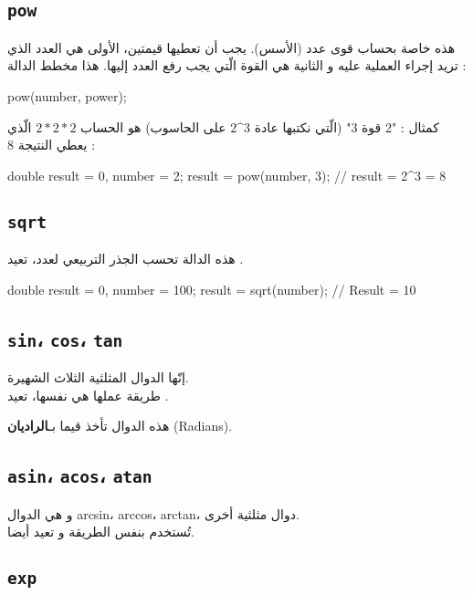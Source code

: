 \subsection{\texttt{pow}}

هذه خاصة بحساب قوى عدد (الأسس). يجب أن تعطيها قيمتين، الأولى هي العدد الذي تريد إجراء العملية عليه و الثانية هي القوة الّتي يجب رفع العدد إليها. هذا مخطط الدالة :

\begin{Csource}
pow(number, power);
\end{Csource}

كمثال : "2 قوة 3" (الّتي نكتبها عادة
$ 2\^{}3 $
على الحاسوب) هو الحساب
$ 2 * 2 * 2 $
الّذي يعطي النتيجة 8 :

\begin{Csource}
double result = 0, number = 2;
result = pow(number, 3); // result = 2^3 = 8
\end{Csource}

\subsection{\texttt{sqrt}}

هذه الدالة تحسب الجذر التربيعي لعدد، تعيد
.

\begin{Csource}
double result = 0, number = 100;
result = sqrt(number); // Result = 10
\end{Csource}

\subsection{\texttt{sin}، \texttt{cos}، \texttt{tan}}

إنّها الدوال المثلثية الثلاث الشهيرة.\\
طريقة عملها هي نفسها، تعيد
.

هذه الدوال تأخذ قيما بـ\textbf{الراديان}
(\textenglish{Radians}).

\subsection{\texttt{asin}، \texttt{acos}، \texttt{atan}}

و هي الدوال
\textenglish{arcsin}، \textenglish{arccos}، \textenglish{arctan}،
دوال مثلثية أخرى.\\
تُستخدم بنفس الطريقة و تعيد
أيضا.

\subsection{\texttt{exp}}

